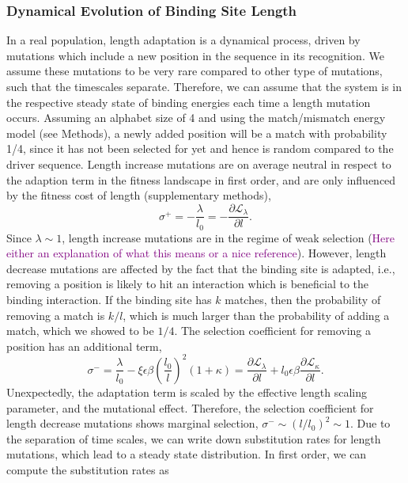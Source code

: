 \documentclass[10pt,a4paper]{article}
\newcommand{\purple}[1]{\textcolor{purple}{#1}}
\begin{document}
\subsubsection*{Dynamical Evolution of Binding Site Length}
In a real population, length adaptation is a dynamical process, driven by mutations which include a new position in the sequence in its recognition. We assume these mutations to be very rare compared to other type of mutations, such that the timescales separate. Therefore, we can assume that the system is in the respective steady state of binding energies each time a length mutation occurs. Assuming an alphabet size of 4 and using the match/mismatch energy model (see Methods), a newly added position will be a match with probability 1/4, since it has not been selected for yet and hence is random compared to the driver sequence. Length increase mutations are on average neutral in respect to the adaption term in the fitness landscape in first order, and are only influenced by the fitness cost of length (supplementary methods),
\begin{equation}
	\sigma^+ = -\frac{\lambda}{l_0} =-\frac{\partial \mathcal{L}_\lambda}{\partial l}.
\end{equation}
Since $\lambda\sim 1$, length increase mutations are in the regime of weak selection (\purple{Here either an explanation of what this means or a nice reference}).
However, length decrease mutations are affected by the fact that the binding site is adapted, i.e., removing a position is likely to hit an interaction which is beneficial to the binding interaction. If the binding site has $k$ matches, then the probability of removing a match is $k/l$, which is much larger than the probability of adding a match, which we showed to be $1/4$. The selection coefficient for removing a position has an additional term,
\begin{equation}
	\sigma^- = \frac{\lambda}{l_0} - \xi \epsilon\beta \left(\frac{l_0}{l}\right)^2 (1+\kappa) = \frac{\partial \mathcal{L}_\lambda}{\partial l} + l_0 \epsilon\beta\frac{\partial \mathcal{L_\kappa}}{\partial l}.
\end{equation}
Unexpectedly, the adaptation term is scaled by the effective length scaling parameter, and the mutational effect. Therefore, the selection coefficient for length decrease mutations shows marginal selection, $\sigma^-\sim (l/l_0)^2\sim 1$. Due to the separation of time scales, we can write down substitution rates for length mutations, which lead to a steady state distribution. In first order, we can compute the substitution rates as 
\end{document}
